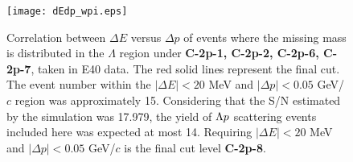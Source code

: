 \begin{figure}[!h]
  \begin{center}
    \texttt{[image: dEdp\_wpi.eps]}
    \caption{Correlation between $\Delta E$ versus $\Delta p$ of events where the missing mass is distributed in the $\Lambda$ region under {\bf C-2p-1, C-2p-2, C-2p-6, C-2p-7}, taken in E40 data. The red solid lines represent the final cut. The event number within the $|\Delta E|<20$ MeV and $|\Delta p|<0.05$ GeV/$c$ region was approximately 15. Considering that the S/N estimated by the simulation was 17.979, the yield of $\Lambda p$ scattering events included here was expected at most 14. Requiring $|\Delta E|<20$ MeV and $|\Delta p|<0.05$ GeV/$c$ is the final cut level {\bf C-2p-8}.}
    \label{fig-dEdp_wopi}
  \end{center}
\end{figure}


